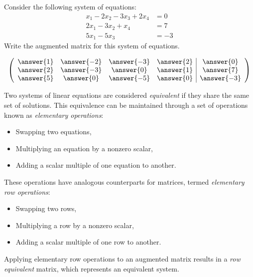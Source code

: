 \documentclass{ximera}
\begin{document}
\begin{question}
  Consider the following system of equations:
  \begin{align*}
    x_1 - 2x_2 - 3x_3 + 2x_4 &= 0 \\
    2x_1 - 3x_2 + x_4 &= 7 \\
    5x_1 - 5x_3 &= -3
  \end{align*}
  Write the augmented matrix for this system of equations.
  \begin{prompt}
    \[
      \left(
        \begin{array}{cccc|c}
          \answer{1} & \answer{-2} & \answer{-3} & \answer{2} & \answer{0} \\
          \answer{2} & \answer{-3} & \answer{0} & \answer{1} & \answer{7} \\
          \answer{5} & \answer{0} & \answer{-5} & \answer{0} & \answer{-3}
        \end{array}
      \right)
    \]
  \end{prompt}
\end{question}

Two systems of linear equations are considered \textit{equivalent} if
they share the same set of solutions. This equivalence can be
maintained through a set of operations known as \textit{elementary
  operations}:
\begin{itemize}
\item Swapping two equations,
\item Multiplying an equation by a nonzero scalar,
\item Adding a scalar multiple of one equation to another.
\end{itemize}
These operations have analogous counterparts for matrices, termed
\textit{elementary row operations}:
\begin{itemize}
\item Swapping two rows,
\item Multiplying a row by a nonzero scalar,
\item Adding a scalar multiple of one row to another.
\end{itemize}
Applying elementary row operations to an augmented matrix results in a
\textit{row equivalent} matrix, which represents an equivalent system.
\end{document}
